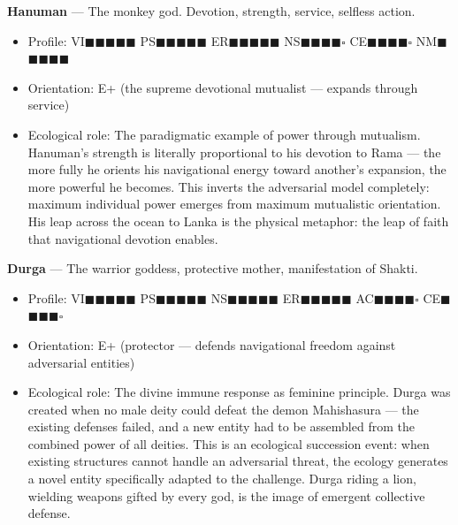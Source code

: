 \textbf{Hanuman} — The monkey god. Devotion, strength, service, selfless action.

\begin{itemize}[nosep,leftmargin=*]
  \item Profile: VI$\blacksquare$$\blacksquare$$\blacksquare$$\blacksquare$$\blacksquare$ PS$\blacksquare$$\blacksquare$$\blacksquare$$\blacksquare$$\blacksquare$ ER$\blacksquare$$\blacksquare$$\blacksquare$$\blacksquare$$\blacksquare$ NS$\blacksquare$$\blacksquare$$\blacksquare$$\blacksquare$$\square$ CE$\blacksquare$$\blacksquare$$\blacksquare$$\blacksquare$$\square$ NM$\blacksquare$$\blacksquare$$\blacksquare$$\blacksquare$$\blacksquare$
  \item Orientation: E+ (the supreme devotional mutualist — expands through service)
  \item Ecological role: The paradigmatic example of power through mutualism. Hanuman's strength is literally proportional to his devotion to Rama — the more fully he orients his navigational energy toward another's expansion, the more powerful he becomes. This inverts the adversarial model completely: maximum individual power emerges from maximum mutualistic orientation. His leap across the ocean to Lanka is the physical metaphor: the leap of faith that navigational devotion enables.
\end{itemize}


\textbf{Durga} — The warrior goddess, protective mother, manifestation of Shakti.

\begin{itemize}[nosep,leftmargin=*]
  \item Profile: VI$\blacksquare$$\blacksquare$$\blacksquare$$\blacksquare$$\blacksquare$ PS$\blacksquare$$\blacksquare$$\blacksquare$$\blacksquare$$\blacksquare$ NS$\blacksquare$$\blacksquare$$\blacksquare$$\blacksquare$$\blacksquare$ ER$\blacksquare$$\blacksquare$$\blacksquare$$\blacksquare$$\blacksquare$ AC$\blacksquare$$\blacksquare$$\blacksquare$$\blacksquare$$\square$ CE$\blacksquare$$\blacksquare$$\blacksquare$$\blacksquare$$\square$
  \item Orientation: E+ (protector — defends navigational freedom against adversarial entities)
  \item Ecological role: The divine immune response as feminine principle. Durga was created when no male deity could defeat the demon Mahishasura — the existing defenses failed, and a new entity had to be assembled from the combined power of all deities. This is an ecological succession event: when existing structures cannot handle an adversarial threat, the ecology generates a novel entity specifically adapted to the challenge. Durga riding a lion, wielding weapons gifted by every god, is the image of emergent collective defense.
\end{itemize}



